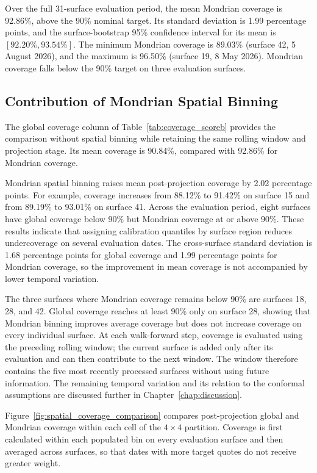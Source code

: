 Over the full 31-surface evaluation period, the mean Mondrian coverage is 92.86\%, above the 90\% nominal target. Its standard deviation is 1.99 percentage points, and the surface-bootstrap 95\% confidence interval for its mean is $[92.20\%,93.54\%]$. The minimum Mondrian coverage is 89.03\% (surface 42, 5 August 2026), and the maximum is 96.50\% (surface 19, 8 May 2026). Mondrian coverage falls below the 90\% target on three evaluation surfaces.

\subsection{Contribution of Mondrian Spatial Binning}
\label{subsec:exp_mondrian_contribution}

The global coverage column of Table~\ref{tab:coverage_scoreb} provides the comparison without spatial binning while retaining the same rolling window and projection stage. Its mean coverage is 90.84\%, compared with 92.86\% for Mondrian coverage.

Mondrian spatial binning raises mean post-projection coverage by 2.02 percentage points. For example, coverage increases from 88.12\% to 91.42\% on surface 15 and from 89.19\% to 93.01\% on surface 41. Across the evaluation period, eight surfaces have global coverage below 90\% but Mondrian coverage at or above 90\%. These results indicate that assigning calibration quantiles by surface region reduces undercoverage on several evaluation dates. The cross-surface standard deviation is 1.68 percentage points for global coverage and 1.99 percentage points for Mondrian coverage, so the improvement in mean coverage is not accompanied by lower temporal variation.

The three surfaces where Mondrian coverage remains below 90\% are surfaces 18, 28, and 42. Global coverage reaches at least 90\% only on surface 28, showing that Mondrian binning improves average coverage but does not increase coverage on every individual surface. At each walk-forward step, coverage is evaluated using the preceding rolling window; the current surface is added only after its evaluation and can then contribute to the next window. The window therefore contains the five most recently processed surfaces without using future information. The remaining temporal variation and its relation to the conformal assumptions are discussed further in Chapter~\ref{chap:discussion}.

Figure~\ref{fig:spatial_coverage_comparison} compares post-projection global and Mondrian coverage within each cell of the $4\times4$ partition. Coverage is first calculated within each populated bin on every evaluation surface and then averaged across surfaces, so that dates with more target quotes do not receive greater weight.

